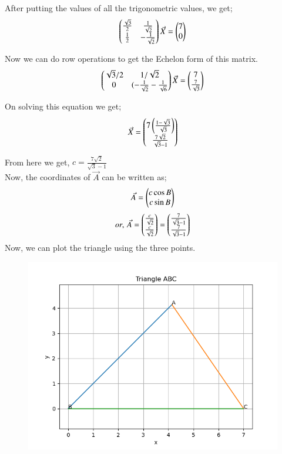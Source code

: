 \documentclass[journal]{IEEEtran}
\begin{document}
After putting the values of all the trigonometric values, we get;
\begin{align}
\begin{pmatrix}\frac{\sqrt{3}}{2} & \frac{1}{\sqrt{2}} \\
       \frac{1}{2} & -\frac{1}{\sqrt{2}}\end{pmatrix}
\Vec{X} = 
\begin{pmatrix}7 \\ 0\end{pmatrix}
\end{align}

Now we can do row operations to get the Echelon form of this matrix.
\begin{align}
\begin{pmatrix}\sqrt{3}/2 & 1/\sqrt{2} \\
    0 & (-\frac{1}{\sqrt{2}} - \frac{1}{\sqrt{6}}\end{pmatrix}
\Vec{X} = 
\begin{pmatrix}7 \\ \frac{7}{\sqrt{3}}\end{pmatrix}
\end{align}

On solving this equation we get;
\begin{align}
\Vec{X} = \begin{pmatrix}7\left(\frac{1-\sqrt{3}}{\sqrt{3}}\right) \\ \frac{7\sqrt{2}}{\sqrt{3}-1}\end{pmatrix}
\end{align}

From here we get, $c=\frac{7\sqrt{2}}{\sqrt{3}-1}$ \\

Now, the coordinates of $\Vec{A}$ can be written as;
\begin{align}
\Vec{A}=\begin{pmatrix}c\cos B \\ c\sin B\end{pmatrix}
\end{align}
\begin{align}
or, \, \Vec{A}=\begin{pmatrix}\frac{c}{\sqrt{2}} \\ \frac{c}{\sqrt{2}}\end{pmatrix}=\begin{pmatrix}\frac{7}{\sqrt{3}-1} \\ \frac{7}{\sqrt{3}-1}\end{pmatrix}
\end{align}
Now, we can plot the triangle using the three points.

\begin{figure}[H]
\centering
\includegraphics[width=0.8\columnwidth]{figs/img.png}
\caption*{}
\end{figure}
\end{document}
